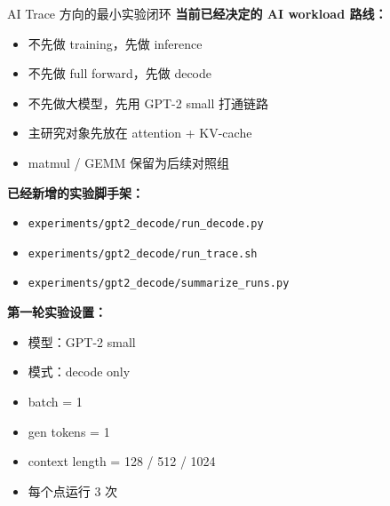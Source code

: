 \documentclass[aspectratio=169]{beamer}
\begin{document}
\begin{frame}{AI Trace 方向的最小实验闭环}
\textbf{当前已经决定的 AI workload 路线：}
\begin{itemize}
  \item 不先做 training，先做 inference
  \item 不先做 full forward，先做 decode
  \item 不先做大模型，先用 GPT-2 small 打通链路
  \item 主研究对象先放在 attention + KV-cache
  \item matmul / GEMM 保留为后续对照组
\end{itemize}

\vspace{0.6em}
\textbf{已经新增的实验脚手架：}
\begin{itemize}
  \item \texttt{experiments/gpt2\_decode/run\_decode.py}
  \item \texttt{experiments/gpt2\_decode/run\_trace.sh}
  \item \texttt{experiments/gpt2\_decode/summarize\_runs.py}
\end{itemize}

\vspace{0.6em}
\textbf{第一轮实验设置：}
\begin{itemize}
  \item 模型：GPT-2 small
  \item 模式：decode only
  \item batch = 1
  \item gen tokens = 1
  \item context length = 128 / 512 / 1024
  \item 每个点运行 3 次
\end{itemize}
\end{frame}
\end{document}
